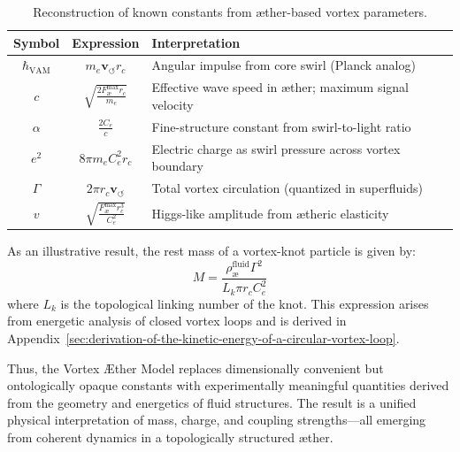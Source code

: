 \begin{table}[H]
    \centering
    \footnotesize
    \renewcommand{\arraystretch}{1.3}
    \begin{tabular}{|c|c|l|}
        \hline
        \textbf{Symbol} & \textbf{Expression} & \textbf{Interpretation} \\
        \hline
        \( \hbar_{\text{VAM}} \) & \( m_e \mathbf{v}_{\scriptscriptstyle\boldsymbol{\circlearrowleft}} r_c \) & Angular impulse from core swirl (Planck analog) \\
        \hline
        \( c \) & \( \sqrt{\frac{2 F^{\text{max}}_{\text{\ae}} r_c}{m_e}} \) & Effective wave speed in æther; maximum signal velocity \\
        \hline
        \( \alpha \) & \( \frac{2 C_e}{c} \) & Fine-structure constant from swirl-to-light ratio \\
        \hline
        \( e^2 \) & \( 8\pi m_e C_e^2 r_c \) & Electric charge as swirl pressure across vortex boundary \\
        \hline
        \( \Gamma \) & \( 2\pi r_c \mathbf{v}_{\scriptscriptstyle\boldsymbol{\circlearrowleft}} \) & Total vortex circulation (quantized in superfluids) \\
        \hline
        \( v \) & \( \sqrt{\frac{F^{\text{max}}_{\text{\ae}} r_c^3}{C_e^2}} \) & Higgs-like amplitude from ætheric elasticity \\
        \hline
    \end{tabular}
    \caption{Reconstruction of known constants from æther-based vortex parameters.}
    \label{tab:VAM_constants}
\end{table}

\noindent As an illustrative result, the rest mass of a vortex-knot particle is given by:
\[
M = \frac{\rho_\text{\ae}^{\text{fluid}} \Gamma^2}{L_k \pi r_c C_e^2}
\]
where \( L_k \) is the topological linking number of the knot. This expression arises from energetic analysis of closed vortex loops and is derived in Appendix~\ref{sec:derivation-of-the-kinetic-energy-of-a-circular-vortex-loop}.

\vspace{0.5em}

Thus, the Vortex Æther Model replaces dimensionally convenient but ontologically opaque constants with experimentally meaningful quantities derived from the geometry and energetics of fluid structures. The result is a unified physical interpretation of mass, charge, and coupling strengths—all emerging from coherent dynamics in a topologically structured æther.

